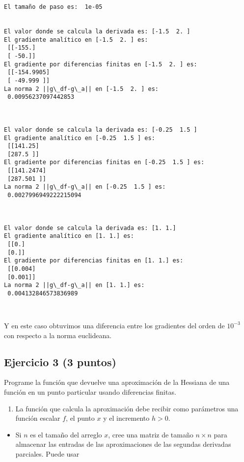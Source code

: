 \documentclass[11pt]{article}
\providecommand{\tightlist}{%
      \setlength{\itemsep}{0pt}\setlength{\parskip}{0pt}}
\begin{document}
    \begin{Verbatim}[commandchars=\\\{\}]
El tamaño de paso es:  1e-05


El valor donde se calcula la derivada es: [-1.5  2. ]
El gradiente analítico en [-1.5  2. ] es:
 [[-155.]
 [ -50.]]
El gradiente por diferencias finitas en [-1.5  2. ] es:
 [[-154.9905]
 [ -49.999 ]]
La norma 2 ||g\_df-g\_a|| en [-1.5  2. ] es:
 0.00956237097442853



El valor donde se calcula la derivada es: [-0.25  1.5 ]
El gradiente analítico en [-0.25  1.5 ] es:
 [[141.25]
 [287.5 ]]
El gradiente por diferencias finitas en [-0.25  1.5 ] es:
 [[141.2474]
 [287.501 ]]
La norma 2 ||g\_df-g\_a|| en [-0.25  1.5 ] es:
 0.0027996949222215094



El valor donde se calcula la derivada es: [1. 1.]
El gradiente analítico en [1. 1.] es:
 [[0.]
 [0.]]
El gradiente por diferencias finitas en [1. 1.] es:
 [[0.004]
 [0.001]]
La norma 2 ||g\_df-g\_a|| en [1. 1.] es:
 0.004132846573836989



    \end{Verbatim}

    Y en este caso obtuvimos una diferencia entre los gradientes del orden
de \(10^{-3}\) con respecto a la norma euclideana.

    \hypertarget{ejercicio-3-3-puntos}{%
\subsection{Ejercicio 3 (3 puntos)}\label{ejercicio-3-3-puntos}}

Programe la función que devuelve una aproximación de la Hessiana de una
función en un punto particular usando diferencias finitas.

\begin{enumerate}
\def\labelenumi{\arabic{enumi}.}
\tightlist
\item
  La función que calcula la aproximación debe recibir como parámetros
  una función escalar \(f\), el punto \(x\) y el incremento \(h>0\).
\end{enumerate}

\begin{itemize}
\tightlist
\item
  Si \(n\) es el tamaño del arreglo \(x\), cree una matriz de tamaño
  \(n \times n\) para almacenar las entradas de las aproximaciones de
  las segundas derivadas parciales. Puede usar
\end{itemize}
\end{document}
